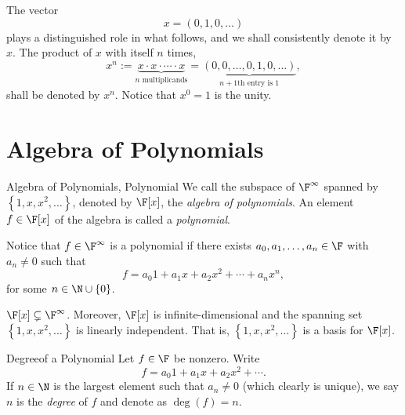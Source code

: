 \documentclass[linearalgebra]{subfiles}
\begin{document}
    \begin{remark}
        The vector
        \begin{equation*}
            x = \left( 0, 1, 0, \ldots \right)
        \end{equation*}
        plays a distinguished role in what follows, and we shall consistently denote it by $x$. The product of $x$ with itself $n$ times,
        \begin{equation*}
            x^n := \underbrace{x\cdot x\cdot\cdots\cdot x}_{n\text{ multiplicands}} = \underbrace{\left( 0, 0, \ldots, 0, 1, 0, \ldots \right)}_{n+1\text{th entry is }1}, 
        \end{equation*}
        shall be denoted by $x^n$. Notice that $x^0 = 1$ is the unity. 
    \end{remark}

    \section{Algebra of Polynomials}

    \begin{definition}{Algebra of Polynomials, Polynomial}{}
        We call the subspace of $\F^\infty$ spanned by $\left\lbrace 1, x, x^2, \ldots \right\rbrace$, denoted by $\F[x]$, the \emph{algebra of polynomials}. An element $f\in\F[x]$ of the algebra is called a \emph{polynomial}.
    \end{definition}

    \begin{remark}
        Notice that $f\in \F^\infty$ is a polynomial if there exists $a_0, a_1, \ldots, a_n\in \F$ with $a_n\neq 0$ such that
        \begin{equation*}
            f = a_0 1+ a_1x+ a_2x^2 + \cdots + a_nx^n,
        \end{equation*}
        for some $n\in \N\cup\left\lbrace 0 \right\rbrace $.
    \end{remark}

    \begin{remark}
        $\F[x]\subsetneq \F^\infty$. Moreover, $\F[x]$ is infinite-dimensional and the spanning set $\left\lbrace 1, x, x^2, \ldots \right\rbrace$ is linearly independent. That is, $\left\lbrace 1, x, x^2, \ldots \right\rbrace$ is a basis for $\F[x]$.
    \end{remark}

    \begin{definition}{Degree}{of a Polynomial}
        Let $f\in \F$ be nonzero. Write
        \begin{equation*}
            f = a_0 1 + a_1x + a_2x^2 + \cdots.
        \end{equation*}
        If $n\in \N$ is the largest element such that $a_n\neq 0$ (which clearly is unique), we say $n$ is the \emph{degree} of $f$ and denote as $\deg(f) = n$.
    \end{definition}
\end{document}
